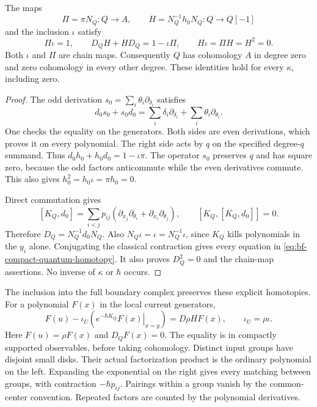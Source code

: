 \begin{theorem}
\label{thm:bf-compact-quantum-contraction}
The maps
\[
 \Pi=\pi N_Q:Q\longrightarrow A,\qquad
 H=N_Q^{-1}h_0N_Q:Q\longrightarrow Q[-1]
\]
and the inclusion $\iota$ satisfy
\begin{equation}
 \label{eq:bf-compact-quantum-homotopy}
 \Pi\iota=1,\qquad D_QH+HD_Q=1-\iota\Pi,
 \qquad H\iota=\Pi H=H^2=0.
\end{equation}
Both $\iota$ and $\Pi$ are chain maps.  Consequently $Q$ has
cohomology $A$ in degree zero and zero cohomology in every other degree.
These identities hold for every $\kappa$, including zero.
\end{theorem}
\begin{proof}
The odd derivation $s_0=\sum_i\theta_i\partial_{\delta_i}$ satisfies
\[
 d_0s_0+s_0d_0
   =\sum_i\delta_i\partial_{\delta_i}
      +\sum_i\theta_i\partial_{\theta_i}.
\]
One checks the equality on the generators.  Both sides are even
derivations, which proves it on every polynomial.  The right side
acts by $q$ on the specified degree-$q$ summand.  Thus
$d_0h_0+h_0d_0=1-\iota\pi$.
The operator $s_0$ preserves $q$ and has square zero, because the
odd factors anticommute while the even derivatives commute.
This also gives $h_0^2=h_0\iota=\pi h_0=0$.

Direct commutation gives
\[
 [K_Q,d_0]=\sum_{i<j}p_{ij}
       (\partial_{x_j}\partial_{\theta_i}
        +\partial_{x_i}\partial_{\theta_j}),\qquad
 [K_Q,[K_Q,d_0]]=0.
\]
Therefore $D_Q=N_Q^{-1}d_0N_Q$.
Also $N_Q\iota=\iota=N_Q^{-1}\iota$, since $K_Q$ kills
polynomials in the $y_i$ alone.  Conjugating the classical contraction
gives every equation in \eqref{eq:bf-compact-quantum-homotopy}.
It also proves $D_Q^2=0$ and the chain-map assertions.
No inverse of $\kappa$ or $\hbar$ occurs.
\end{proof}

The inclusion into the full boundary complex preserves these explicit
homotopies.  For a polynomial $F(x)$ in the local current generators,
\begin{equation}
 \label{eq:bf-compact-wick-chain}
 F(u)-\iota_U\!\left(
       \left.e^{-\hbar K_Q}F(x)\right|_{x=y}\right)
       =D\rho H F(x),
 \qquad \iota_U=\rho\iota.
\end{equation}
Here $F(u)=\rho F(x)$ and $D_QF(x)=0$.
The equality is in compactly supported observables, before taking
cohomology.  Distinct input groups have disjoint small disks.
Their actual factorization product is the ordinary polynomial
on the left.  Expanding the exponential on the right gives every
matching between groups, with contraction $-\hbar p_{ij}$.
Pairings within a group vanish by the common-center convention.
Repeated factors are counted by the polynomial derivatives.

